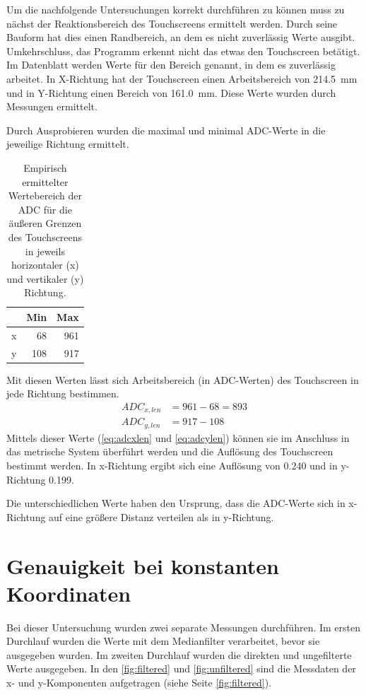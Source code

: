 Um die nachfolgende Untersuchungen korrekt durchführen zu können muss zu nächst der Reaktionsbereich des Touchscreens ermittelt werden.
Durch seine Bauform hat dies einen Randbereich, an dem es nicht zuverlässig Werte ausgibt.
Umkehrschluss, das Programm erkennt nicht das etwas den Touchscreen betätigt.
Im Datenblatt werden Werte für den Bereich genannt, in dem es zuverlässig arbeitet.
In X-Richtung hat der Touchscreen einen Arbeitsbereich von \SI{214,5}{mm} und in Y-Richtung einen Bereich von \SI{161,0}{mm}.
Diese Werte wurden durch Messungen ermittelt.

Durch Ausprobieren wurden die maximal und minimal ADC-Werte in die jeweilige Richtung ermittelt.


\begin{table}[h]
    \centering
    \caption[Empirisch ermittelter Wertebereich der ADC]{Empirisch ermittelter Wertebereich der ADC für die äußeren Grenzen des Touchscreens in jeweils horizontaler (x) und vertikaler (y) Richtung.}
    \begin{tabular}{@{}lrr@{}}
        \toprule
            &Min    &Max\\
        \midrule
        x   &68     &961\\
        y   &108    &917\\
        \bottomrule
    \end{tabular}
    \label{tab:ADC min max}
\end{table}

Mit diesen Werten lässt sich Arbeitsbereich (in ADC-Werten) des Touchscreen in jede Richtung bestimmen.
\begin{align}
    ADC_{x,len} &= 961 - 68 = 893
    \label{eq:adcxlen}\\
    ADC_{y,len} &= 917 - 108
    \label{eq:adcylen}
\end{align}
Mittels dieser Werte (\cref{eq:adcxlen} und \cref{eq:adcylen}) können sie im Anschluss in das metrische System überführt werden und die Auflösung des Touchscreen bestimmt werden.
In x-Richtung ergibt sich eine Auflösung von \SI{0,240}{} und in y-Richtung \SI{0,199}{}.

Die unterschiedlichen Werte haben den Ursprung, dass die ADC-Werte sich in x-Richtung auf eine größere Distanz verteilen als in y-Richtung.

\section{Genauigkeit bei konstanten Koordinaten}
\label{ab:genau}
Bei dieser Untersuchung wurden zwei separate Messungen durchführen.
Im ersten Durchlauf wurden die Werte mit dem Medianfilter verarbeitet, bevor sie ausgegeben wurden.
Im zweiten Durchlauf wurden die direkten und ungefilterte Werte ausgegeben.
In den \cref{fig:filtered} und \cref{fig:unfiltered} sind die Messdaten der x- und y-Komponenten aufgetragen (siehe Seite \cref{fig:filtered}).

